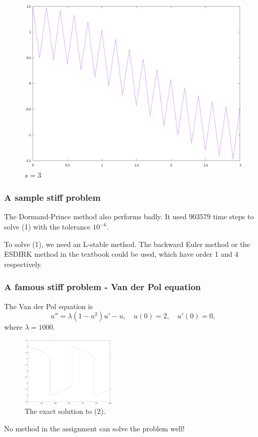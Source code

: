 \documentclass[9pt]{beamer}
\begin{document}
\begin{frame}
\begin{figure}[H]
\begin{minipage}[t]{0.32\linewidth}
        \caption{$s=2$}
    \end{minipage}
    \begin{minipage}[t]{0.32\linewidth}
        \centering
        \includegraphics[width=0.95\linewidth]{pic/1-5.eps}
        \caption{$s=3$}
    \end{minipage}
  \end{figure}
\end{frame}

\begin{frame}
  \frametitle{A sample stiff problem}
  The Dormand-Prince method also performs badly. It used 903579 time steps to solve (1) with the tolerance $10^{-6}$.

  \vspace{1em}
  To solve (1), we need an L-stable method. The backward Euler method or the ESDIRK method in the textbook could be used, which have order 1 and 4 respectively.
\end{frame}

\begin{frame}
  \frametitle{A famous stiff problem - Van der Pol equation}

  The Van der Pol equation is
  \begin{equation}
    u''=\lambda (1-u^2)u'-u,\quad u(0)=2,\quad u'(0)=0,
  \end{equation}
  where $\lambda=1000$.

  \begin{figure}
    \centering
    \includegraphics[width=0.4\textwidth]{pic/1-6.eps}
    \caption{The exact solution to (2).}
  \end{figure}

  No method in the assignment can solve the problem well!
\end{frame}
\end{document}
